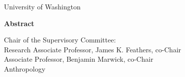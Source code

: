 \begin{titlingpage}
\begin{center}
\vfill

{\large University of Washington \par}

\vfill

 {\large \textbf{Abstract} \par}%
 
 \vfill
 
    {\large \thesisTitle\par}
    
  \vfill
  
      {\large \thesisAuthor\par}%
      
      \vfill
      
      {\large Chair of the Supervisory Committee:\\
      Research Associate Professor, James K. Feathers, co-Chair\\
	Associate Professor, Benjamin Marwick, co-Chair\\
	Anthropology\\}

	\vfill
	
\end{center}
	

\end{titlingpage}

